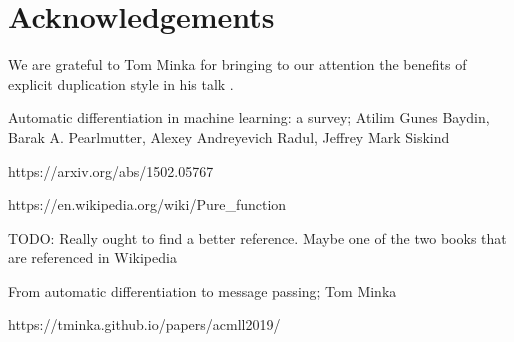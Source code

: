 \documentclass[12pt]{article}
\begin{document}


\section{Acknowledgements}

We are grateful to Tom Minka for bringing to our attention the
benefits of explicit duplication style in his talk \cite{minka}.

\begin{thebibliography}{9}

  Automatic differentiation in machine learning: a survey;
  Atilim Gunes Baydin, Barak A. Pearlmutter, Alexey Andreyevich Radul, Jeffrey Mark Siskind
  
https://arxiv.org/abs/1502.05767
  
  https://en.wikipedia.org/wiki/Pure\_function

  TODO: Really ought to find a better reference.  Maybe one of the two
  books that are referenced in Wikipedia

  From automatic differentiation to message passing; Tom Minka

  https://tminka.github.io/papers/acmll2019/

\end{thebibliography}
\end{document}
